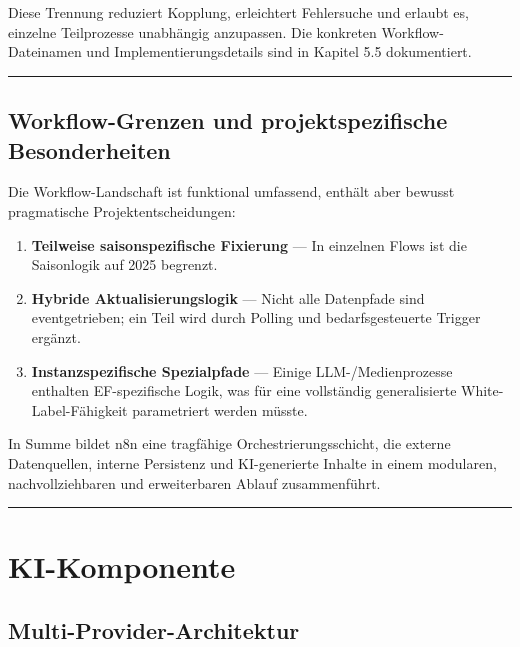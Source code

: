 Diese Trennung reduziert Kopplung, erleichtert Fehlersuche und erlaubt
es, einzelne Teilprozesse unabhängig anzupassen. Die konkreten
Workflow-Dateinamen und Implementierungsdetails sind in Kapitel 5.5
dokumentiert.

\begin{center}\rule{0.5\linewidth}{0.5pt}\end{center}

\subsection{Workflow-Grenzen und projektspezifische
Besonderheiten}\label{workflow-grenzen-und-projektspezifische-besonderheiten}

Die Workflow-Landschaft ist funktional umfassend, enthält aber bewusst
pragmatische Projektentscheidungen:

\begin{enumerate}
\def\labelenumi{\arabic{enumi}.}
\tightlist
\item
  \textbf{Teilweise saisonspezifische Fixierung} --- In einzelnen Flows
  ist die Saisonlogik auf 2025 begrenzt.
\item
  \textbf{Hybride Aktualisierungslogik} --- Nicht alle Datenpfade sind
  eventgetrieben; ein Teil wird durch Polling und bedarfsgesteuerte
  Trigger ergänzt.
\item
  \textbf{Instanzspezifische Spezialpfade} --- Einige
  LLM-/Medienprozesse enthalten EF-spezifische Logik, was für eine
  vollständig generalisierte White-Label-Fähigkeit parametriert werden
  müsste.
\end{enumerate}

In Summe bildet n8n eine tragfähige Orchestrierungsschicht, die externe
Datenquellen, interne Persistenz und KI-generierte Inhalte in einem
modularen, nachvollziehbaren und erweiterbaren Ablauf zusammenführt.

\begin{center}\rule{0.5\linewidth}{0.5pt}\end{center}

\section{KI-Komponente}\label{ki-komponente}

\subsection{Multi-Provider-Architektur}\label{multi-provider-architektur}

